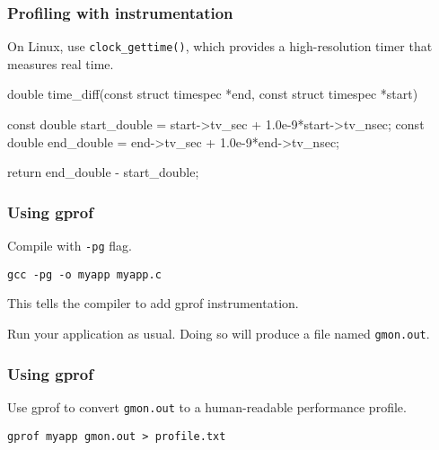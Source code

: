 \documentclass[12pt,t]{beamer}
\let\emph\relax %
\newcommand{\cmd}[1]{\begin{center}\texttt{#1}\end{center}}
\begin{document}
  \begin{frame}[fragile]
    \frametitle{Profiling with instrumentation}

    On Linux, use \texttt{clock\_gettime()}, which provides a high-resolution timer that measures real time.

    \begin{code}
double time_diff(const struct timespec *end,
                 const struct timespec *start)
{
  const double start_double
    = start->tv_sec + 1.0e-9*start->tv_nsec;
  const double end_double
    = end->tv_sec + 1.0e-9*end->tv_nsec;

  return end_double - start_double;
}
    \end{code}
  \end{frame}



  \begin{frame}[fragile]
    \frametitle{Using gprof}

    \emph{Step 1:} Compile with \texttt{-pg} flag.
    \cmd{gcc -pg -o myapp myapp.c}

    This tells the compiler to add gprof instrumentation.

    \emph{Step 2:} Run your application as usual. Doing so will produce a file named \texttt{gmon.out}.
  \end{frame}

  \begin{frame}[fragile]
    \frametitle{Using gprof}

    \emph{Step 3:} Use gprof to convert \texttt{gmon.out} to a human-readable performance profile.
    \cmd{gprof myapp gmon.out > profile.txt}
  \end{frame}
\end{document}
